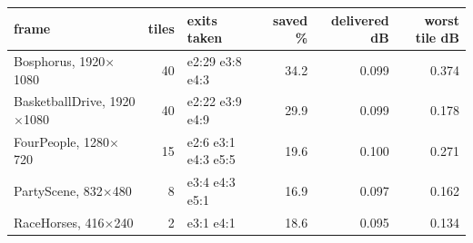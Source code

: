 \begin{tabular}{lrlrrr}
\toprule
frame & tiles & exits taken & saved \% & delivered dB & worst tile dB \\
\midrule
Bosphorus, 1920$\times$1080 & 40 & e2:29 e3:8 e4:3 & 34.2 & 0.099 & 0.374 \\
BasketballDrive, 1920$\times$1080 & 40 & e2:22 e3:9 e4:9 & 29.9 & 0.099 & 0.178 \\
FourPeople, 1280$\times$720 & 15 & e2:6 e3:1 e4:3 e5:5 & 19.6 & 0.100 & 0.271 \\
PartyScene, 832$\times$480 & 8 & e3:4 e4:3 e5:1 & 16.9 & 0.097 & 0.162 \\
RaceHorses, 416$\times$240 & 2 & e3:1 e4:1 & 18.6 & 0.095 & 0.134 \\
\bottomrule
\end{tabular}
